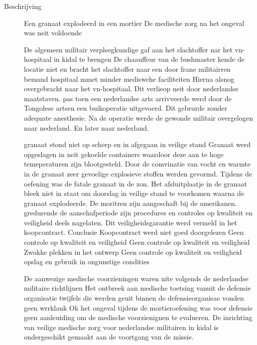 \begin{description}
	\item[Beschrijving]
	
	Een granaat explodeerd in een mortier
	De medische zorg na het ongeval was neit voldoende
	
	
	De algemeen militair verpleegkundige gaf aan het slachtoffer nar het vn-hospitaal in kidal te brengen
	De chaauffeur van de bushmaster kende de locatie niet  en bracht het slachtoffer naar een door frane militairren bemand hospitaal mmet minder mediswche faciliteiten
	Hierna alsnog overgebracht naar het vn-hospitaal.
	Dit verlieop  neit door nederlandse maatstaven.
	pas toen een nederlandse arts arrivveerde werd door de Tongolese artsen een buikoperatie uitgevoerd.
	Dit gebrurde zonder adequate anesthesie.
	Na de operatie werde de gewonde militair overgelogen naar nederland. En later naar nederland.
	
	
	granaat stond niet op scherp en in afgegaan in veilige stand
	Granaat werd opgeslagen in neit gekoelde containers waardoor deze aan te hoge temeperaturen zijn blootgesteld.
	Door de comvinatie van vocht en warmte in de granaat zeer gevoelige explosieve stoffen werden gevormd.
	Tijdens de oefening was de fatale granaat in de zon.
	Het afsluitplaatje in de granaat bleek niet in staat om doorslag in veilige stand te voorkomen waarna de granaat explodeerde.
	De moritren zijn aangeschaft bij de amerikanen. gredurende de aanschafperiode zijn procedures en controles op kwaliteit en veiligheid deels nagelaten.
	Dit veiligheidsgarantie werd vermeld in het koopcontract.
	Conclusie
	Koopcontract werd niet goed doorgelezen
	Geen controle op kwaliteit en veiligheid
	Geen controle op kwaliteit en veiligheid
	Zwakke plekken in het ontwerp
	Geen controle op kwaliteit en veiligheid
	opslag en gebruik in ongunstige condities
	
	De aanwezige medische voorzieningen waren nite volgends de nederlandse militaire richtlijnen
	Het ontbreek aan medische toetsing vanuit de defensie organisatie
	twijfels die werden geuit binnen de defensieorganisae vonden geen wrrklank
	Ok het ongeval tijdens de mortieroefening was voor defensie geen aanleuiding om de medische voorzienignen te evalueren.
	De inrichting van veilige medische zorg voor nederlandse militairen in kidal is ondergeschikt gemaakt aan de voortgang van de missie.
	
	
	\cite{ovvMortierOngevalMaliVideo} 
	\cite{bnnvara13062018malirapport}
	\cite{eucal11012021malimissieverlengd}
	\cite{nos21052014zorgenmalimissie}
	\cite{meijnders}
	\cite{bnrwebredactie}
	\cite{keultjes01062016malimissiecoalitie}
	\cite{veenhof18012019}
	

\end{description}
